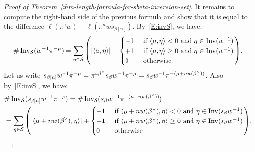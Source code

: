 \documentclass[10pt]{amsart}
\newcommand{\textif}{\text{ if }}\newcommand{\textand}{\text{ and }}\newcommand{\textor}{\text{ or }}\newcommand{\suchthat}{\mid}
\begin{document}
\begin{proof}[Proof of Theorem~\ref{thm-length-formula-for-sbeta-inversion-set}]
It remains to compute the right-hand side of the previous formula and show that it is equal to the difference $\ell(\pi^\mu w)-\ell(\pi^\mu ws_{\beta[n]})$. By~\eqref{E:invS}, we have:
\begin{equation*}
\# \Inv_{\cS}(w^{-1} \pi^{-\mu}) = \sum_{\eta \in \cS} \left(|\langle \mu, \eta \rangle| +
\begin{cases}
-1 & \textif \langle \mu, \eta \rangle < 0 \textand \eta \in \Inv(w^{-1}) \\
+1 & \textif \langle \mu, \eta \rangle \geq 0 \textand \eta \in \Inv(w^{-1}) \\
0 & \text{ otherwise}
\end{cases}
\right)\!.
\end{equation*}
Let us write $s_{\beta[n]} w^{-1} \pi^{-\mu} = \pi^{n\beta^\vee} s_\beta w^{-1} \pi^{-\mu} = s_\beta w^{-1} \pi^{ - (\mu + n w(\beta^\vee))}$. Also by~\eqref{E:invS}, we have:
\begin{align*}
&\# \Inv_{\cS}(s_{\beta[n]} w^{-1} \pi^{-\mu})= \# \Inv_{\cS}(s_\beta w^{-1} \pi^{ - (\mu + n w(\betacheck))})\\ &=
\sum_{\eta \in \cS} \left(|\langle \mu + n w(\betacheck), \eta \rangle| +
\begin{cases}
-1 & \textif \langle \mu + n w(\betacheck), \eta \rangle < 0 \textand \eta \in \Inv(s_\beta w^{-1}) \\
+1 & \textif \langle \mu + n w(\betacheck), \eta \rangle \geq 0 \textand \eta \in \Inv(s_\beta w^{-1}) \\
0 & \text{ otherwise}
\end{cases}
\right)\!.
\end{align*}


\end{proof}
\end{document}
